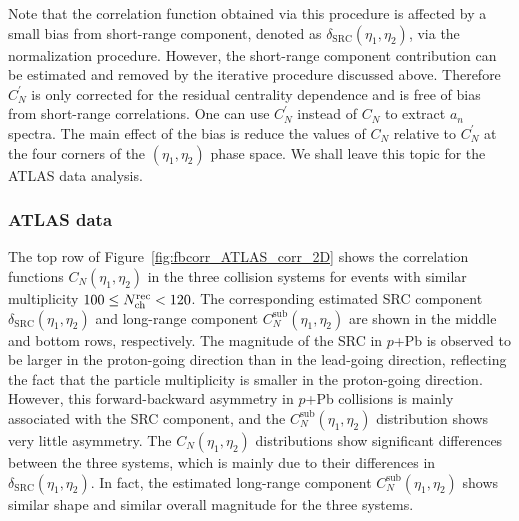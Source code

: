 Note that the correlation function obtained via this procedure is affected by a small bias from short-range component, denoted as $\delta_\text{SRC}(\eta_1, \eta_2)$, via the normalization procedure.  However, the short-range component contribution can be estimated and removed by the iterative procedure discussed above. Therefore $C_N^{'}$ is only corrected for the residual centrality dependence and is free of bias from short-range correlations. One can use $C_N^{'}$ instead of $C_N$ to extract $a_n$ spectra. The main effect of the bias is reduce the values of $C_N$ relative to $C_N^{'}$ at the four corners of the $(\eta_1, \eta_2)$ phase space. We shall leave this topic for the ATLAS data analysis.



\subsubsection{ATLAS data}
\label{sec:fb_atlas_data}

The top row of Figure~\ref{fig:fbcorr_ATLAS_corr_2D} shows the correlation functions $C_N(\eta_1, \eta_2)$ in the three collision systems for events with similar multiplicity $100 \le N_\text{ch}^\text{rec} < 120$. The corresponding estimated SRC component $\delta_\text{SRC}(\eta_1, \eta_2)$ and long-range component $C_N^\text{sub}(\eta_1, \eta_2)$ are shown in the middle and bottom rows, respectively. The magnitude of the SRC in $p$+Pb is observed to be larger in the proton-going direction than in the lead-going direction, reflecting the fact that the particle multiplicity is smaller in the proton-going direction. However, this forward-backward asymmetry in $p$+Pb collisions is mainly associated with the SRC component, and the $C_N^\text{sub}(\eta_1, \eta_2)$ distribution shows very little asymmetry. The $C_N(\eta_1, \eta_2)$ distributions show significant differences between the three systems, which is mainly due to their differences in $\delta_\text{SRC}(\eta_1, \eta_2)$. In fact, the estimated long-range component $C_N^\text{sub}(\eta_1, \eta_2)$ shows similar shape and similar overall magnitude for the three systems.

